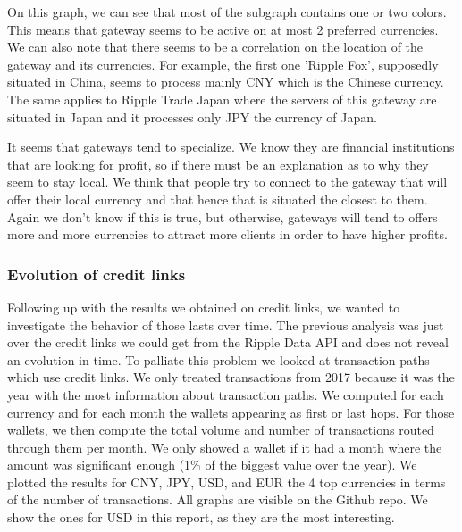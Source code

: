 On this graph, we can see that most of the subgraph contains one or two colors. This means that gateway seems to be active on at most 2 preferred currencies. We can also note that there seems to be a correlation on the location of the gateway and its currencies. For example, the first one 'Ripple Fox', supposedly situated in China, seems to process mainly CNY which is the Chinese currency. The same applies to Ripple Trade Japan where the servers of this gateway are situated in Japan and it processes only JPY the currency of Japan. 

It seems that gateways tend to specialize. We know they are financial institutions that are looking for profit, so if there must be an explanation as to why they seem to stay local. We think that people try to connect to the gateway that will offer their local currency and that hence that is situated the closest to them. Again we don't know if this is true, but otherwise, gateways will tend to offers more and more currencies to attract more clients in order to have higher profits.

\subsubsection{Evolution of credit links}
Following up with the results we obtained on credit links, we wanted to investigate the behavior of those lasts over time. The previous analysis was just over the credit links we could get from the Ripple Data API\cite{data-api} and does not reveal an evolution in time. To palliate this problem we looked at transaction paths which use credit links. We only treated transactions from 2017 because it was the year with the most information about transaction paths. We computed for each currency and for each month the wallets appearing as first or last hops. For those wallets, we then compute the total volume and number of transactions routed through them per month. We only showed a wallet if it had a month where the amount was significant enough (1\% of the biggest value over the year). We plotted the results for CNY, JPY, USD, and EUR the 4 top currencies in terms of the number of transactions. All graphs are visible on the Github repo\cite{repo}. We show the ones for USD in this report, as they are the most interesting. 

